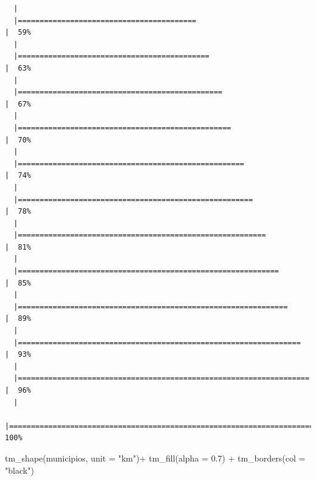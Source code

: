 \documentclass[
  letterpaper,
  DIV=11,
  numbers=noendperiod]{scrartcl}
\newenvironment{Shaded}{\begin{snugshade}}{\end{snugshade}}
\newcommand{\AttributeTok}[1]{\textcolor[rgb]{0.40,0.45,0.13}{#1}}
\newcommand{\FloatTok}[1]{\textcolor[rgb]{0.68,0.00,0.00}{#1}}
\newcommand{\FunctionTok}[1]{\textcolor[rgb]{0.28,0.35,0.67}{#1}}
\newcommand{\NormalTok}[1]{\textcolor[rgb]{0.00,0.23,0.31}{#1}}
\newcommand{\SpecialCharTok}[1]{\textcolor[rgb]{0.37,0.37,0.37}{#1}}
\newcommand{\StringTok}[1]{\textcolor[rgb]{0.13,0.47,0.30}{#1}}
\begin{document}
\begin{verbatim}
  |                                                                            
  |=========================================                             |  59%
  |                                                                            
  |============================================                          |  63%
  |                                                                            
  |===============================================                       |  67%
  |                                                                            
  |=================================================                     |  70%
  |                                                                            
  |====================================================                  |  74%
  |                                                                            
  |======================================================                |  78%
  |                                                                            
  |=========================================================             |  81%
  |                                                                            
  |============================================================          |  85%
  |                                                                            
  |==============================================================        |  89%
  |                                                                            
  |=================================================================     |  93%
  |                                                                            
  |===================================================================   |  96%
  |                                                                            
  |======================================================================| 100%
\end{verbatim}

\begin{Shaded}
\begin{Highlighting}[]
\FunctionTok{tm\_shape}\NormalTok{(municipios, }\AttributeTok{unit =} \StringTok{"km"}\NormalTok{)}\SpecialCharTok{+}
  \FunctionTok{tm\_fill}\NormalTok{(}\AttributeTok{alpha =} \FloatTok{0.7}\NormalTok{) }\SpecialCharTok{+} 
  \FunctionTok{tm\_borders}\NormalTok{(}\AttributeTok{col =} \StringTok{"black"}\NormalTok{)}
\end{Highlighting}
\end{Shaded}
\end{document}
